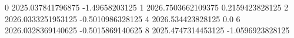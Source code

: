 0 2025.037841796875 -1.49658203125
1 2026.7503662109375 0.2159423828125
2 2026.0333251953125 -0.5010986328125
4 2026.534423828125 0.0
6 2026.0328369140625 -0.5015869140625
8 2025.4747314453125 -1.0596923828125
